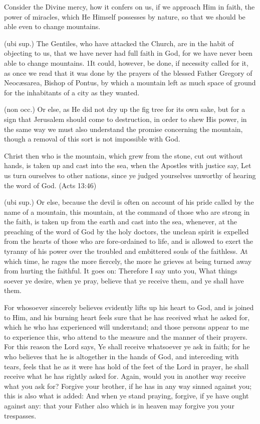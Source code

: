  Consider the Divine mercy, how it confers on us, if we approach Him in faith, the power of miracles, which He Himself possesses by nature, so that we should be able even to change mountains.

 (ubi sup.) The Gentiles, who have attacked the Church, are in the habit of objecting to us, that we have never had full faith in God, for we have never been able to change mountains. 1It could, however, be done, if necessity called for it, as once we read that it was done by the prayers of the blessed Father Gregory of Neocæsarea, Bishop of Pontus, by which a mountain left as much space of ground for the inhabitants of a city as they wanted.

 (non occ.) Or else, as He did not dry up the fig tree for its own sake, but for a sign that Jerusalem should come to destruction, in order to shew His power, in the same way we must also understand the promise concerning the mountain, though a removal of this sort is not impossible with God.

 Christ then who is the mountain, which grew from the stone, cut out without hands, is taken up and cast into the sea, when the Apostles with justice say, Let us turn ourselves to other nations, since ye judged yourselves unworthy of hearing the word of God. (Acts 13:46)

 (ubi sup.) Or else, because the devil is often on account of his pride called by the name of a mountain, this mountain, at the command of those who are strong in the faith, is taken up from the earth and cast into the sea, whenever, at the preaching of the word of God by the holy doctors, the unclean spirit is expelled from the hearts of those who are fore-ordained to life, and is allowed to exert the tyranny of his power over the troubled and embittered souls of the faithless. At which time, he rages the more fiercely, the more he grieves at being turned away from hurting the faithful. It goes on: Therefore I say unto you, What things soever ye desire, when ye pray, believe that ye receive them, and ye shall have them.

 For whosoever sincerely believes evidently lifts up his heart to God, and is joined to Him, and his burning heart feels sure that he has received what he asked for, which he who has experienced will understand; and those persons appear to me to experience this, who attend to the measure and the manner of their prayers. For this reason the Lord says, Ye shall receive whatsoever ye ask in faith; for he who believes that he is altogether in the hands of God, and interceding with tears, feels that he as it were has hold of the feet of the Lord in prayer, he shall receive what he has rightly asked for. Again, would you in another way receive what you ask for? Forgive your brother, if he has in any way sinned against you; this is also what is added: And when ye stand praying, forgive, if ye have ought against any: that your Father also which is in heaven may forgive you your trespasses.

